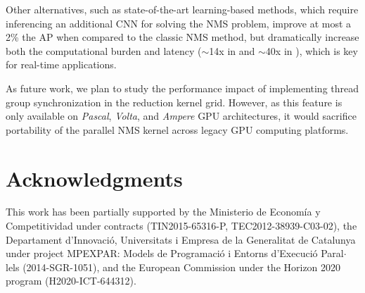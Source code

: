 Other alternatives, such as state-of-the-art learning-based methods, which require inferencing an additional CNN for solving the NMS problem, 
improve at most a 2\% \cite{hosang2017learning,qiu2019graph} the AP when compared to the classic NMS method, but 
dramatically increase both the computational burden and latency ($\sim$14x in \cite{hosang2017learning} and $\sim$40x in \cite{qiu2019graph}), which 
is key for real-time applications.

As future work, we plan to study the performance impact of implementing thread group synchronization in the reduction 
kernel grid. However, as this feature is only available on \emph{Pascal}, \emph{Volta}, and \emph{Ampere} GPU architectures, it would 
sacrifice portability of the parallel NMS kernel across legacy GPU computing platforms.

\section*{Acknowledgments}

This work has been partially supported by the Ministerio de Econom\'ia y Competitividad under contracts (TIN2015-65316-P, TEC2012-38939-C03-02), the 
Departament d'Innovaci\'o, Universitats i Empresa de la Generalitat de Catalunya under project MPEXPAR: Models de Programaci\'o i Entorns d'Execuci\'o 
Paral$\cdot$lels (2014-SGR-1051), and the European Commission under the Horizon 2020 program (H2020-ICT-644312).

